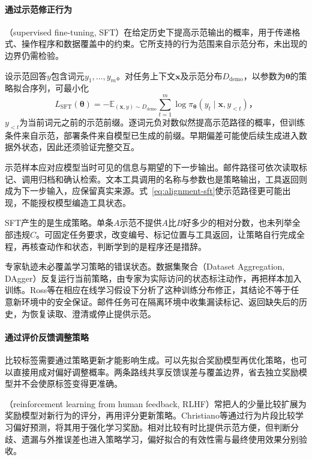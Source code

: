 \paragraph{通过示范修正行为}

（supervised fine-tuning, SFT）在给定历史下提高示范输出的概率，用于传递格式、操作程序和数据覆盖中的约束。它所支持的行为范围来自示范分布，未出现的边界仍需检验。

设示范回答$y$包含词元$y_1,\ldots,y_m$。对任务上下文$\bm{x}$及示范分布$D_{\mathrm{demo}}$，以参数为$\bm\theta$的策略拟合序列，可最小化
\begin{equation}
 L_{\mathrm{SFT}}(\bm{\theta})
 =-\mathbb E_{(\bm{x},y)\sim D_{\mathrm{demo}}}
   \sum_{t=1}^{m}\log\pi_{\bm{\theta}}
          (y_t\mid\bm{x},y_{<t})\text{，}
 \label{eq:alignment-sft}
\end{equation}
$y_{<t}$为当前词元之前的示范前缀。逐词元负对数似然提高示范路径的概率，但训练条件来自示范，部署条件来自模型已生成的前缀。早期偏差可能使后续生成进入数据外状态，因此还须验证完整交互。

示范样本应对应模型当时可见的信息与期望的下一步输出。邮件路径可依次读取标记、调用归档和确认检索。文本工具调用的名称与参数也是策略输出，工具返回则成为下一步输入，应保留真实来源。式~\eqref{eq:alignment-sft}使示范路径更可能出现，不能授权模型编造工具状态。

SFT产生的是生成策略。单条$A$示范不提供$A$比$B$好多少的相对分数，也未列举全部违规$C$。可固定任务要求，改变编号、标记位置与工具返回，让策略自行完成全程，再核查动作和状态，判断学到的是程序还是措辞。

专家轨迹未必覆盖学习策略的错误状态。数据集聚合（Dataset Aggregation, DAgger）反复运行当前策略，由专家为实际访问的状态标注动作，再把样本加入训练。Ross等在相应在线学习假设下分析了这种训练分布修正，其结论不等于任意新环境中的安全保证。邮件任务可在隔离环境中收集漏读标记、返回缺失后的历史，为恢复读取、澄清或停止提供示范。

\paragraph{通过评价反馈调整策略}

比较标签需要通过策略更新才能影响生成。可以先拟合奖励模型再优化策略，也可以直接用成对偏好调整概率。两条路线共享反馈误差与覆盖边界，省去独立奖励模型并不会使原标签变得更准确。

（reinforcement learning from human feedback, RLHF）常把人的少量比较扩展为奖励模型对新行为的评分，再用评分更新策略。Christiano等通过行为片段比较学习偏好预测，将其用于强化学习奖励。相对比较有时比提供示范方便，但判断分歧、遗漏与外推误差也进入策略学习，偏好拟合的有效性需与最终使用效果分别验收。

